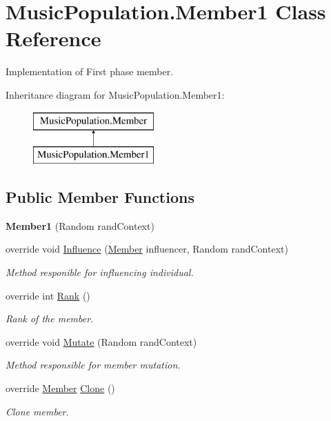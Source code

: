 \hypertarget{class_music_population_1_1_member1}{\section{Music\+Population.\+Member1 Class Reference}
\label{class_music_population_1_1_member1}
}


Implementation of First phase member.  


Inheritance diagram for Music\+Population.\+Member1\+:\begin{figure}[H]
\begin{center}
\leavevmode
\includegraphics[height=2.000000cm]{class_music_population_1_1_member1}
\end{center}
\end{figure}
\subsection*{Public Member Functions}
\begin{DoxyCompactItemize}
\item 
\hypertarget{class_music_population_1_1_member1_aef8953b43d7d0f2e3433fef744e000e1}{{\bfseries Member1} (Random rand\+Context)}\label{class_music_population_1_1_member1_aef8953b43d7d0f2e3433fef744e000e1}

\item 
override void \hyperlink{class_music_population_1_1_member1_a1661d1dcac2b013fc77b669611648365}{Influence} (\hyperlink{class_music_population_1_1_member}{Member} influencer, Random rand\+Context)
\begin{DoxyCompactList}\small\item\em Method responible for influencing individual. \end{DoxyCompactList}\item 
override int \hyperlink{class_music_population_1_1_member1_acb90358a28ed446f2373fe0be35a8b01}{Rank} ()
\begin{DoxyCompactList}\small\item\em Rank of the member. \end{DoxyCompactList}\item 
override void \hyperlink{class_music_population_1_1_member1_ae0f96683b9fdfdfee1418f5b606b772c}{Mutate} (Random rand\+Context)
\begin{DoxyCompactList}\small\item\em Method responsible for member mutation. \end{DoxyCompactList}\item 
override \hyperlink{class_music_population_1_1_member}{Member} \hyperlink{class_music_population_1_1_member1_a6f3395ebd0d2c9ebe4834eeece0df200}{Clone} ()
\begin{DoxyCompactList}\small\item\em Clone member. \end{DoxyCompactList}\end{DoxyCompactItemize}
